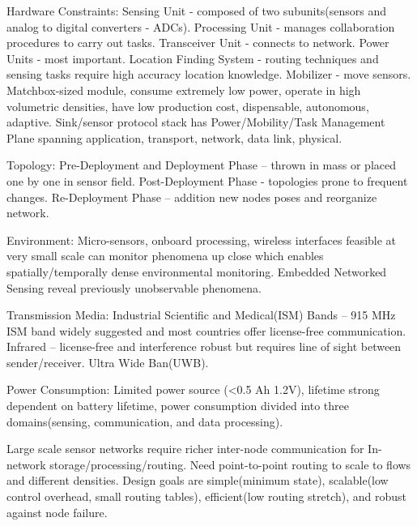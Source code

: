 \documentclass[8pt]{extarticle}
\begin{document}
\begin{multicols}{2}
Hardware Constraints: Sensing Unit - composed of two subunits(sensors and analog to digital converters - ADCs). Processing Unit - manages collaboration procedures to carry out tasks. Transceiver Unit - connects to network. Power Units  - most important. Location Finding System - routing techniques and sensing tasks require high accuracy location knowledge. Mobilizer - move sensors. Matchbox-sized module, consume extremely low power, operate in high volumetric densities, have low production cost, dispensable, autonomous, adaptive. Sink/sensor protocol stack has Power/Mobility/Task Management Plane spanning application, transport, network, data link, physical.

Topology: Pre-Deployment and Deployment Phase – thrown in mass or placed one by one in sensor field. Post-Deployment Phase - topologies prone to frequent changes. Re-Deployment Phase – addition new nodes poses and reorganize network.

Environment: Micro-sensors, onboard processing, wireless interfaces feasible at very small scale can monitor phenomena up close which enables spatially/temporally dense environmental monitoring. Embedded Networked Sensing reveal previously unobservable phenomena.

Transmission Media: Industrial Scientific and Medical(ISM) Bands – 915 MHz ISM band widely suggested and most countries offer license-free communication. Infrared – license-free and interference robust but requires line of sight between sender/receiver. Ultra Wide Ban(UWB).

Power Consumption: Limited power source (<0.5 Ah 1.2V), lifetime strong dependent on battery lifetime, power consumption divided into three domains(sensing, communication, and data processing).

Large scale sensor networks require richer inter-node communication for In-network storage/processing/routing. Need point-to-point routing to scale to flows and different densities. Design goals are simple(minimum state), scalable(low control overhead, small routing tables), efficient(low routing stretch), and robust against node failure.


\end{multicols}
\end{document}
